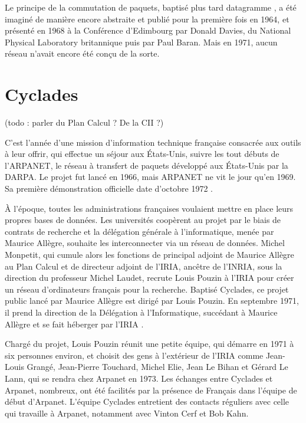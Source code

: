 \documentclass[12pt]{report}
\begin{document}
Le principe de la commutation de paquets, baptisé plus tard \og datagramme \fg, a été imaginé de manière encore abstraite et publié pour la première fois en 1964, et présenté en 1968 à la Conférence d'Edimbourg par Donald Davies, du National Physical Laboratory britannique puis par Paul Baran. Mais en 1971, aucun réseau n'avait encore été conçu de la sorte.

\section{Cyclades}

(todo : parler du Plan Calcul ? De la CII ?)

C'est l'année d'une mission d’information technique française consacrée aux outils à leur offrir, qui effectue un séjour aux États-Unis, suivre les tout débuts de l'\gls{ARPANET}, le réseau à transfert de paquets développé aux États-Unis par la \gls{DARPA}. Le projet fut lancé en 1966, mais ARPANET ne vit le jour qu'en 1969. Sa première démonstration officielle date d'octobre 1972 \cite{wikiarpa}.

À l'époque, toutes les administrations françaises voulaient mettre en place leurs propres bases de données. Les universités coopèrent au projet par le biais de contrats de recherche et la délégation générale à l'informatique, menée par Maurice Allègre, souhaite les interconnecter via un réseau de données. Michel Monpetit, qui cumule alors les fonctions de principal adjoint de Maurice Allègre au Plan Calcul et de directeur adjoint de l'IRIA, ancêtre de l'\gls{INRIA}, sous la direction du professeur Michel Laudet, recrute Louis Pouzin à l'IRIA pour créer un réseau d'ordinateurs français pour la recherche. Baptisé Cyclades, ce projet public lancé par Maurice Allègre est dirigé par Louis Pouzin. En septembre 1971, il prend la direction de la Délégation à l’Informatique, succédant à Maurice Allègre et se fait héberger par l’IRIA \cite{wikicyc}.

Chargé du projet, Louis Pouzin réunit une petite équipe, qui démarre en 1971 à six personnes environ, et choisit des gens à l’extérieur de l’IRIA comme Jean-Louis Grangé, Jean-Pierre Touchard, Michel Elie, Jean Le Bihan et Gérard Le Lann, qui se rendra chez Arpanet en 1973. Les échanges entre Cyclades et Arpanet, nombreux, ont été facilités par la présence de Français dans l'équipe de début d'Arpanet. L'équipe Cyclades entretient des contacts réguliers avec celle qui travaille à Arpanet, notamment avec Vinton Cerf et Bob Kahn.
\end{document}
